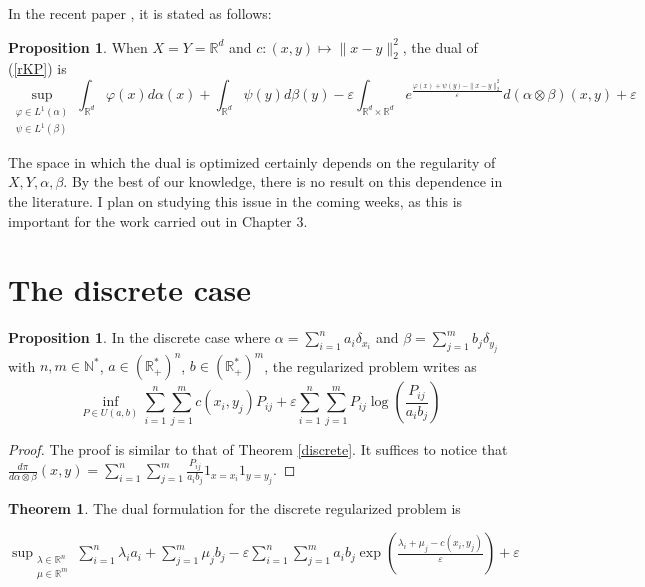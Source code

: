 \documentclass[12pt]{report}
\theoremstyle{definition}
\newtheorem{thm}[defi]{Theorem}
\newtheorem{prop}[defi]{Proposition}
\theoremstyle{remark}
\begin{document}
In the recent paper \cite{mena2019statistical}, it is stated as follows:

\begin{prop}
	When $X=Y=\mathbb R^d$ and $c:(x,y)\mapsto \|x-y\|_2^2$, the dual of (\ref{rKP}) is 
	\begin{equation*}\tag{Dual Reg. KP 2}\label{dualrKP2}
		\sup_{\substack{\varphi \in L^1(\alpha)\\\psi \in L^1(\beta)}} \int_{\mathbb R^d} \varphi(x) d\alpha(x) + \int_{\mathbb R^d} \psi(y) d\beta(y) -\varepsilon \int_{\mathbb R^d\times \mathbb R^d} e^{\frac{\varphi(x)+\psi(y)-\|x-y\|_2^2}\varepsilon} d(\alpha\otimes\beta)(x,y) + \varepsilon
	\end{equation*}
\end{prop}

The space in which the dual is optimized certainly depends on the regularity of $X,Y, \alpha, \beta$. By the best of our knowledge, there is no result on this dependence in the literature. I plan on studying this issue in the coming weeks, as this is important for the work carried out in Chapter 3.

\newpage
\section{The discrete case}

\begin{prop}\label{discretereg}
	In the discrete case where $\alpha=\sum_{i=1}^n a_i \delta_{x_i}$ and $\beta=\sum_{j=1}^m b_j \delta_{y_j}$ with $n,m\in \mathbb N^*$, $a\in (\mathbb R_+^*)^n$, $b\in (\mathbb R_+^*)^m$, the regularized problem writes as \begin{equation*}
	\inf_{P\in U(a,b)} \sum_{i=1}^n\sum_{j=1}^m c(x_i,y_j)P_{ij} + \varepsilon \sum_{i=1}^n\sum_{j=1}^m P_{ij}\log\left(\frac{P_{ij}}{a_i b_j} \right)
	\end{equation*}
\end{prop}

\begin{proof}
	The proof is similar to that of Theorem \ref{discrete}. It suffices to notice that\\ $\displaystyle \frac{d\pi}{d\alpha\otimes \beta}(x,y)=\sum_{i=1}^n\sum_{j=1}^m \frac{P_{ij}}{a_i b_j} 1_{x=x_i}1_{y=y_j}$.
\end{proof}

\begin{thm}
	The dual formulation for the discrete regularized problem is 
	\begin{center}
		$\displaystyle \sup_{\substack{\lambda\in \mathbb R^n\\ \mu\in \mathbb R^m}} \sum_{i=1}^n \lambda_i a_i+\sum_{j=1}^m \mu_j b_j - \varepsilon \sum_{i=1}^n\sum_{j=1}^m a_i b_j \exp\left(\frac{\lambda_i+\mu_j-c(x_i,y_j)}{\varepsilon}\right) + \varepsilon$
	\end{center}
\end{thm}
\end{document}

